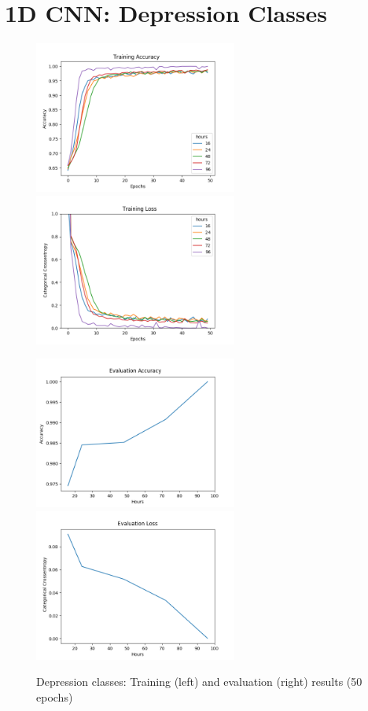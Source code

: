 \section{1D CNN: Depression Classes}

\begin{figure}
      \begin{multicols}{2}
            \includegraphics[height=5cm]{img/depression_class/plot_acc_train.png}
            \includegraphics[height=5cm]{img/depression_class/plot_loss_train.png}

            \includegraphics[height=5cm]{img/depression_class/plot_acc_eval.png}
            \includegraphics[height=5cm]{img/depression_class/plot_loss_eval.png}
      \end{multicols}
      \caption{Depression classes: Training (left) and evaluation (right) results (50 epochs)}
      \label{figure:depression_class_50e}
\end{figure}

